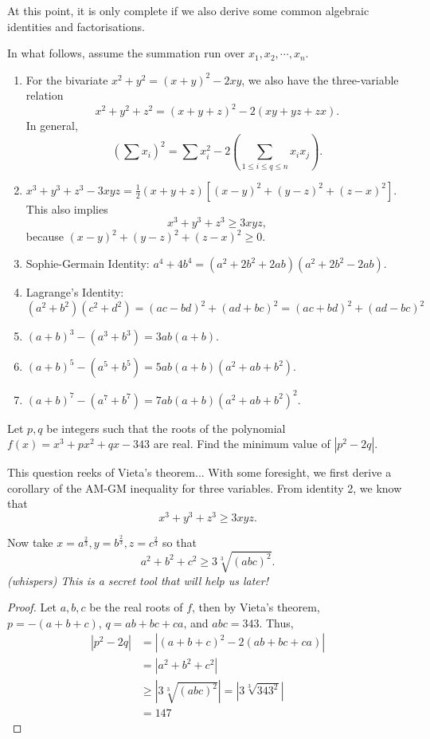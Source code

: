 \documentclass[../jarvis.tex]{subfiles}
\begin{document}
At this point, it is only complete if we also derive some common algebraic identities and factorisations. 
\begin{proposition}[Classic]
    In what follows, assume the summation run over $x_1,x_2,\cdots,x_n$.
    \begin{enumerate}
        \item For the bivariate $x^2+y^2=(x+y)^2-2xy$, we also have the three-variable relation $$x^2+y^2+z^2=(x+y+z)^2-2(xy+yz+zx).$$
        In general, $$\left(\sum x_i\right)^2=\sum x_i^2-2\left(\sum_{1\leq i\leq q\leq n}x_ix_j\right).$$

        \item $x^3+y^3+z^3-3xyz=\frac{1}{2}(x+y+z)[(x-y)^2+(y-z)^2+(z-x)^2]$.
        This also implies $$x^3+y^3+z^3 \geq 3xyz,$$ because
        $(x-y)^2+(y-z)^2+(z-x)^2\geq 0$.
        \item Sophie-Germain Identity: $a^4+4b^4=(a^2+2b^2+2ab)(a^2+2b^2-2ab)$.
        \item Lagrange's Identity: $(a^2+b^2)(c^2+d^2)=(ac-bd)^2+(ad+bc)^2=(ac+bd)^2+(ad-bc)^2$
        \item $(a+b)^3-(a^3+b^3)=3ab(a+b)$.
        \item $(a+b)^5-(a^5+b^5)=5ab(a+b)(a^2+ab+b^2)$.
        \item $(a+b)^7-(a^7+b^7)=7ab(a+b)(a^2+ab+b^2)^2$.
    \end{enumerate}
\end{proposition}
\begin{example}[2016 SMO(O) P15]
    Let $p,q$ be integers such that the roots of the polynomial $f(x)=x^3+px^2+qx-343$ are real. Find the minimum value of $|p^2-2q|$.
\end{example}
This question reeks of Vieta's theorem... With some foresight, we first derive a corollary of the AM-GM inequality for three variables. From identity 2, we know that
    $$x^3+y^3+z^3 \geq 3xyz.$$

    Now take $x=a^{\frac{2}{3}}, y=b^{\frac{2}{3}}, z=c^{\frac{2}{3}}$ so that
    $$a^2+b^2+c^2\geq 3\sqrt[3]{(abc)^2}.$$
    \textit{(whispers) This is a secret tool that will help us later!}
\begin{proof}
    
    Let $a,b,c$ be the real roots of $f$, then by Vieta's theorem, $p=-(a+b+c)$, $q=ab+bc+ca$, and $abc=343$.
    Thus,
    \begin{align*}
        |p^2-2q|&=|(a+b+c)^2-2(ab+bc+ca)| \\
        &=|a^2+b^2+c^2| \\
        &\geq |3\sqrt[3]{(abc)^2}| = |3\sqrt[3]{343^2}| \\
        &=\boxed{147}
    \end{align*}
\end{proof}
\end{document}
